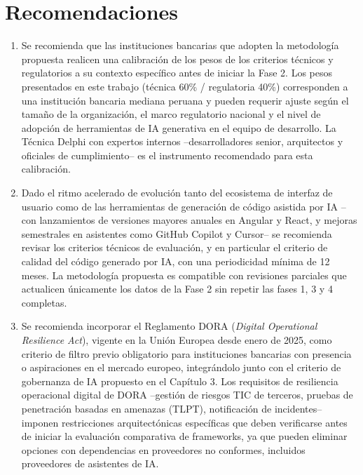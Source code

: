 \chapter*{Recomendaciones}

\begin{enumerate}
  \item Se recomienda que las instituciones bancarias que adopten la
        metodología propuesta realicen una calibración de los pesos de los
        criterios técnicos y regulatorios a su contexto específico antes de
        iniciar la Fase 2. Los pesos presentados en este trabajo
        (técnica 60\% / regulatoria 40\%) corresponden a una institución
        bancaria mediana peruana y pueden requerir ajuste según el tamaño
        de la organización, el marco regulatorio nacional y el nivel de
        adopción de herramientas de IA generativa en el equipo de
        desarrollo. La Técnica Delphi con expertos internos --desarrolladores
        senior, arquitectos y oficiales de cumplimiento-- es el instrumento
        recomendado para esta calibración.

  \item Dado el ritmo acelerado de evolución tanto del ecosistema de
        interfaz de usuario como de las herramientas de generación de
        código asistida por IA --con lanzamientos de versiones mayores
        anuales en Angular y React, y mejoras semestrales en asistentes
        como GitHub Copilot y Cursor-- se recomienda revisar los criterios
        técnicos de evaluación, y en particular el criterio de calidad del
        código generado por IA, con una periodicidad mínima de 12 meses. La
        metodología propuesta es compatible con revisiones parciales que
        actualicen únicamente los datos de la Fase 2 sin repetir las fases
        1, 3 y 4 completas.

  \item Se recomienda incorporar el Reglamento DORA (\emph{Digital
        Operational Resilience Act}), vigente en la Unión Europea desde enero
        de 2025, como criterio de filtro previo obligatorio para
        instituciones bancarias con presencia o aspiraciones en el mercado
        europeo, integrándolo junto con el criterio de gobernanza de IA
        propuesto en el Capítulo 3. Los requisitos de resiliencia
        operacional digital de DORA --gestión de riesgos TIC de terceros,
        pruebas de penetración basadas en amenazas (TLPT), notificación de
        incidentes-- imponen restricciones arquitectónicas específicas que
        deben verificarse antes de iniciar la evaluación comparativa de
        frameworks, ya que pueden eliminar opciones con dependencias en
        proveedores no conformes, incluidos proveedores de asistentes de IA.


\end{enumerate}

